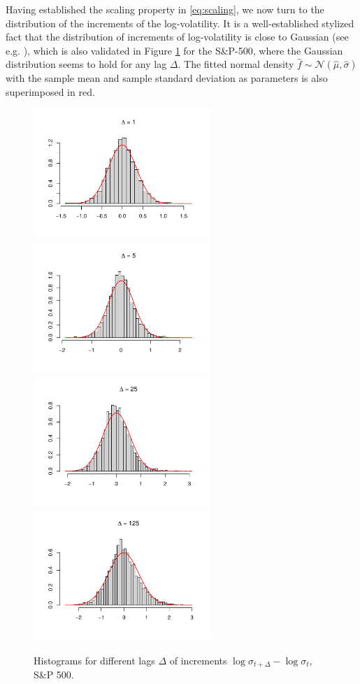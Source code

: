 Having established the scaling property in \eqref{eq:scaling}, we now turn to the distribution of the increments of the log-volatility. It is a well-established stylized fact that the distribution of increments of log-volatility is close to Gaussian (see e.g. \cite{bollerslev}), which is also validated in Figure \ref{fig:histograms} for the S\&P-500, where the Gaussian distribution seems to hold for any lag $\Delta$. The fitted normal density $\hat{f}\sim \mathcal{N}(\hat{\mu}, \hat{\sigma})$ with the sample mean and sample standard deviation as parameters is also superimposed in red.\vspace{-7 pt}
 \begin{figure}[H]
    \centering
    \includegraphics[scale=0.5, width = 6.7cm]{fig/img/RealizedLib/histograms/histogram1.pdf}
    \includegraphics[scale=0.5, width = 6.7cm]{fig/img/RealizedLib/histograms/histogram5.pdf}\hfill
    \includegraphics[scale=0.5, width = 6.7cm]{fig/img/RealizedLib/histograms/histogram25.pdf}
    \includegraphics[scale=0.5, width = 6.7cm]{fig/img/RealizedLib/histograms/histogram125.pdf}
    \caption{Histograms for different lags $\Delta$ of increments $\log\sigma_{t+\Delta}-\log\sigma_{t}$, S\&P 500.}
    \label{fig:histograms}
\end{figure}
